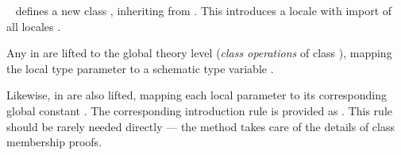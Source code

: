 \begin{isabellebody}
\begin{isamarkuptext}
  \begin{description}

  \item \hyperlink{command.class}{\mbox{}}~ defines
  a new class , inheriting from .  This
  introduces a locale  with import of all locales .

  Any \hyperlink{element.fixes}{\mbox{}} in  are lifted to the global
  theory level (\emph{class operations}  of class ), mapping the local type parameter
   to a schematic type variable .

  Likewise, \hyperlink{element.assumes}{\mbox{}} in  are also lifted,
  mapping each local parameter  to its
  corresponding global constant .  The
  corresponding introduction rule is provided as .  This rule should be rarely needed directly
  --- the \hyperlink{method.intro-classes}{\mbox{}} method takes care of the details of
  class membership proofs.


\end{description}
\end{isamarkuptext}
\end{isabellebody}
